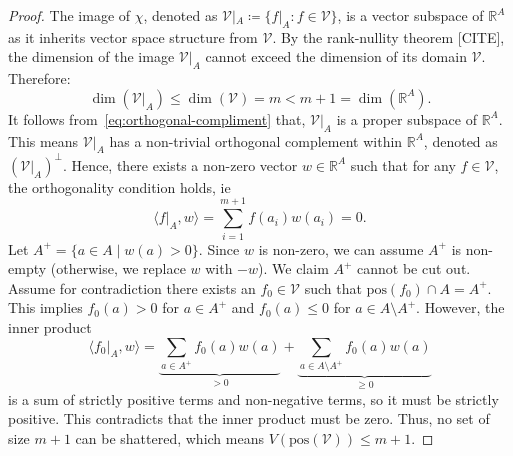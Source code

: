 \begin{proof}
    The image of $\chi$, denoted as $\mathcal{V}|_A \coloneqq \{f|_A : f \in \mathcal{V}\}$, is a vector subspace of $\mathbb{R}^A$ as it inherits vector space structure from $\mathcal{V}$. By the rank-nullity theorem [CITE], the dimension of the image $\mathcal{V}|_A$ cannot exceed the dimension of its domain $\mathcal{V}$. Therefore:
    \begin{equation}
        \label{eq:orthogonal-compliment}
        \dim(\mathcal{V}|_A) \le \dim(\mathcal{V}) = m < m+1 = \dim(\mathbb{R}^A).
    \end{equation}
    It follows from~\ref{eq:orthogonal-compliment} that, $\mathcal{V}|_A$ is a proper subspace of $\mathbb{R}^A$. This means $\mathcal{V}|_A$ has a non-trivial orthogonal complement within $\mathbb{R}^A$, denoted as $(\mathcal{V}|_A)^\perp$. Hence, there exists a non-zero vector $w \in \mathbb{R}^A$ such that for any $f \in \mathcal{V}$, the orthogonality condition holds, ie
    \[
        \langle f|_A, w \rangle = \sum_{i=1}^{m+1} f(a_i) w(a_i) = 0.
    \]
    Let $A^+ = \{a \in A \mid w(a) > 0\}$. Since $w$ is non-zero, we can assume $A^+$ is non-empty (otherwise, we replace $w$ with $-w$). We claim $A^+$ cannot be cut out. Assume for contradiction there exists an $f_0 \in \mathcal{V}$ such that $\text{pos}(f_0) \cap A = A^+$. This implies $f_0(a) > 0$ for $a \in A^+$ and $f_0(a) \le 0$ for $a \in A \setminus A^+$.
    However, the inner product
    \[
        \langle f_0|_A, w \rangle = \underbrace{\sum_{a \in A^+} f_0(a) w(a)}_{> 0} + \underbrace{\sum_{a \in A \setminus A^+} f_0(a) w(a)}_{\geq 0}
    \]
    is a sum of strictly positive terms and non-negative terms, so it must be strictly positive. This contradicts that the inner product must be zero. Thus, no set of size $m+1$ can be shattered, which means $V(\text{pos}(\mathcal{V})) \le m+1$.


\end{proof}
